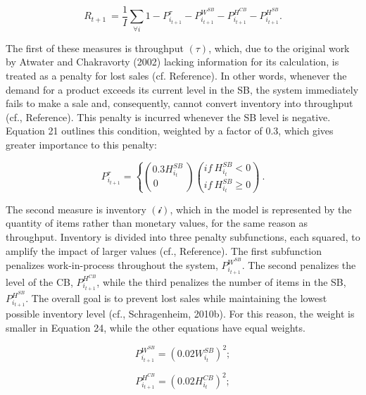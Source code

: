 \begin{equation}
R_{t + 1}\  = \frac{1}{I}\sum_{\forall i}^{}{1 - P_{i_{t + 1}}^{\tau} - P_{i_{t + 1}}^{W^{SB}} - P_{i_{t + 1}}^{H^{CB}} - P_{i_{t + 1}}^{H^{SB}}}.
\tag{20}
\end{equation}

The first of these measures is throughput \((\tau)\), which, due to the
original work by Atwater and Chakravorty (\colorbox{yellow!40}{2002}) lacking information
for its calculation, is treated as a penalty for lost sales (\colorbox{yellow!40}{cf.
Reference}). In other words, whenever the demand for a product exceeds
its current level in the SB, the system immediately fails to make a sale
and, consequently, cannot convert inventory into throughput (\colorbox{yellow!40}{cf.,
Reference}). This penalty is incurred whenever the SB level is negative.
Equation 21 outlines this condition, weighted by a factor of 0.3, which
gives greater importance to this penalty:

\begin{equation}
P_{i_{t + 1}}^{\tau} = \left\{ \binom{0.3H_{i_{t}}^{SB}\ }{0\ \ \ \ \ \ \ \ \ \ \ \ }\binom{if\ H_{i_{t}}^{SB} < 0}{if\ H_{i_{t}}^{SB} \geq 0} \right.\ .
\tag{21}
\end{equation}

The second measure is inventory \(\mathcal{(i)}\), which in the model is
represented by the quantity of items rather than monetary values, for
the same reason as throughput. Inventory is divided into three penalty
subfunctions, each squared, to amplify the impact of larger values
(\colorbox{yellow!40}{cf., Reference}). The first subfunction penalizes work-in-process
throughout the system, \(P_{i_{t + 1}}^{W^{SB}}\). The second penalizes
the level of the CB, \(P_{i_{t + 1}}^{H^{CB}}\), while the third
penalizes the number of items in the SB, \(P_{i_{t + 1}}^{H^{SB}}\). The
overall goal is to prevent lost sales while maintaining the lowest
possible inventory level (\colorbox{yellow!40}{cf., Schragenheim, 2010b}). For this
reason, the weight is smaller in Equation 24, while the other equations
have equal weights.

\begin{equation}
P_{i_{t + 1}}^{W^{SB}} = \left( 0.02W_{i_{t}}^{SB} \right)^{2};
\tag{22}
\end{equation}

\begin{equation}
P_{i_{t + 1}}^{H^{CB}} = \left( 0.02H_{i_{t}}^{CB} \right)^{2};
\tag{23}
\end{equation}

